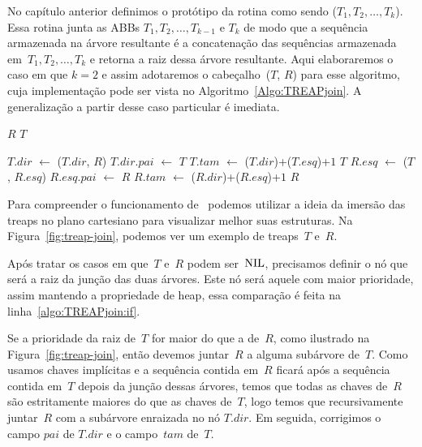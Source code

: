 No capítulo anterior definimos o protótipo da rotina \treapJoin{} como sendo \treapJoin($T_1, T_2, \ldots, T_k$).
Essa rotina junta as ABBs $T_1, T_2, \ldots, T_{k-1}$ e $T_k$ de modo que a sequência armazenada na árvore resultante é a concatenação das sequências armazenada em~$T_1, T_2, \ldots, T_k$ e retorna a raiz dessa árvore resultante.
Aqui elaboraremos o caso em que $k=2$ e assim adotaremos o cabeçalho~\treapJoin($T$, $R$) para esse algoritmo, cuja implementação pode ser vista no Algoritmo~\ref{Algo:TREAPjoin}.
A generalização a partir desse caso particular é imediata.

\begin{algorithm}
\caption{\treapJoin($T$, $R$)}
\label{Algo:TREAPjoin}
\begin{algorithmic}[1]
 \Return $R$
\EndIf
{} \Return $T$
\EndIf

\label{algo:TREAPjoin:if}
  \State $T$.$dir$ $\gets$ \treapJoin($T$.$dir$, $R$)
  \State $T$.$dir$.$pai$ $\gets$ $T$
  \State $T$.$tam$ $\gets$ \treapGetSize($T$.$dir$)+\treapGetSize($T$.$esq$)+$1$
  \State \Return $T$
\Else 
  \State $R$.$esq$ $\gets$ \treapJoin($T$, $R$.$esq$)
  \State $R$.$esq$.$pai$ $\gets$ $R$
  \State $R$.$tam$ $\gets$ \treapGetSize($R$.$dir$)+\treapGetSize($R$.$esq$)+$1$
  \State \Return $R$
\EndIf
\end{algorithmic}
\end{algorithm}


Para compreender o funcionamento de~\treapJoin{} podemos utilizar a ideia da imersão das treaps no plano cartesiano para visualizar melhor suas estruturas.
Na Figura~\ref{fig:treap-join}, podemos ver um exemplo de treaps~$T$ e~$R$.


Após tratar os casos em que~$T$ e~$R$ podem ser~$\text{NIL}$, precisamos definir o nó que será a raiz da junção das duas árvores.
Este nó será aquele com maior prioridade, assim mantendo a propriedade de heap, essa comparação é feita na linha~\ref{algo:TREAPjoin:if}.

Se a prioridade da raiz de~$T$ for maior do que a de~$R$, como ilustrado na Figura~\ref{fig:treap-join}, então devemos juntar~$R$ a alguma subárvore de~$T$.
Como usamos chaves implícitas e a sequência contida em~$R$ ficará após a sequência contida em~$T$ depois da junção dessas árvores,
temos que todas as chaves de~$R$ são estritamente maiores do que as chaves de~$T$, logo temos que recursivamente juntar~$R$ com a subárvore enraizada no nó $T$.$dir$.
Em seguida, corrigimos o campo $pai$ de $T$.$dir$ e o campo~$tam$ de~$T$.


